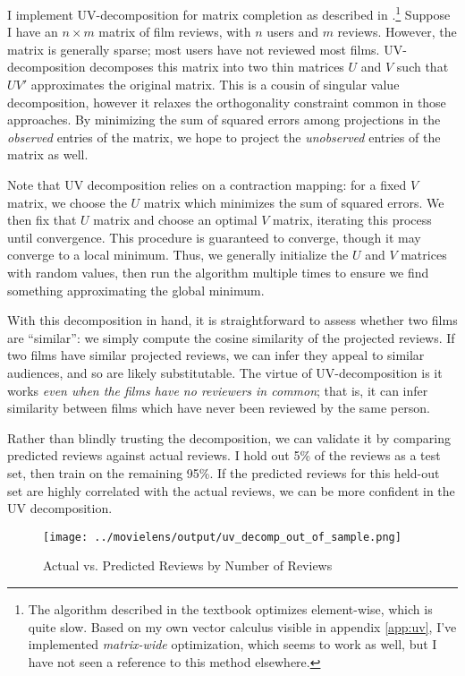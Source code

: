 \documentclass{article}
\begin{document}
I implement UV-decomposition for matrix completion as described in \textcite{leskovec2020MMD}.\footnote{The algorithm described in the textbook optimizes element-wise, which is quite slow. Based on my own vector calculus visible in appendix \ref{app:uv}, I've implemented \emph{matrix-wide} optimization, which seems to work as well, but I have not seen a reference to this method elsewhere.} Suppose I have an $n \times m$ matrix of film reviews, with $n$ users and $m$ reviews. However, the matrix is generally sparse; most users have not reviewed most films. UV-decomposition decomposes this matrix into two thin matrices $U$ and $V$ such that $UV'$ approximates the original matrix. This is a cousin of singular value decomposition, however it relaxes the orthogonality constraint common in those approaches. By minimizing the sum of squared errors among projections in the \emph{observed} entries of the matrix, we hope to project the \emph{unobserved} entries of the matrix as well. 

Note that UV decomposition relies on a contraction mapping: for a fixed $V$ matrix, we choose the $U$ matrix which minimizes the sum of squared errors. We then fix that $U$ matrix and choose an optimal $V$ matrix, iterating this process until convergence. This procedure is guaranteed to converge, though it may converge to a local minimum. Thus, we generally initialize the $U$ and $V$ matrices with random values, then run the algorithm multiple times to ensure we find something approximating the global minimum. 

With this decomposition in hand, it is straightforward to assess whether two films are ``similar'': we simply compute the cosine similarity of the projected reviews. If two films have similar projected reviews, we can infer they appeal to similar audiences, and so are likely substitutable. The virtue of UV-decomposition is it works \emph{even when the films have no reviewers in common}; that is, it can infer similarity between films which have never been reviewed by the same person.

Rather than blindly trusting the decomposition, we can validate it by comparing predicted reviews against actual reviews. I hold out 5\% of the reviews as a test set, then train on the remaining 95\%. If the predicted reviews for this held-out set are highly correlated with the actual reviews, we can be more confident in the UV decomposition.

\begin{figure}
    \begin{center}
    \texttt{[image: ../movielens/output/uv\_decomp\_out\_of\_sample.png]}
    \caption{Actual vs. Predicted Reviews by Number of Reviews}
    \label{fig:actual_vs_predicted}
    \end{center}
\end{figure}
\end{document}
